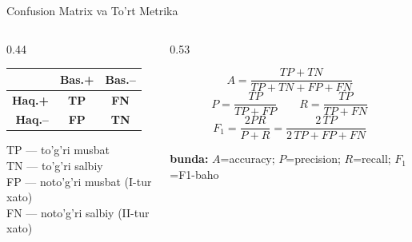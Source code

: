 \documentclass[aspectratio=169,11pt]{beamer}
\newcommand{\bunda}[1]{{\small\textbf{bunda:}\; #1}}
\begin{document}
\begin{frame}{Confusion Matrix va To'rt Metrika}
  \begin{columns}[T]
    \begin{column}{0.44\textwidth}
      \small
      \begin{center}
        {\renewcommand{\arraystretch}{1.4}%
        \begin{tabular}{r|cc}
          & \textbf{Bas.+} & \textbf{Bas.--} \\
          \hline
          \textbf{Haq.+} &
            \textcolor{deepgreen}{\textbf{TP}} &
            \textcolor{deepred}{\textbf{FN}} \\
          \textbf{Haq.--} &
            \textcolor{deepred}{\textbf{FP}} &
            \textcolor{deepgreen}{\textbf{TN}} \\
        \end{tabular}}
      \end{center}
      \vspace{4pt}
      \footnotesize
      TP --- to'g'ri musbat\\
      TN --- to'g'ri salbiy\\
      FP --- noto'g'ri musbat (I-tur xato)\\
      FN --- noto'g'ri salbiy (II-tur xato)
    \end{column}
    \begin{column}{0.53\textwidth}
      \begin{tcolorbox}[defbox,title=To'rt metrika]
        \small
        \[
          A = \frac{TP+TN}{TP+TN+FP+FN}
        \]
        \[
          P = \frac{TP}{TP+FP}
          \qquad
          R = \frac{TP}{TP+FN}
        \]
        \[
          F_1 = \frac{2PR}{P+R}
              = \frac{2\,TP}{2\,TP+FP+FN}
        \]
      \end{tcolorbox}
      \bunda{%
        $A$=accuracy;\;
        $P$=precision;\;
        $R$=recall;\;
        $F_1$=F1-baho%
      }
    \end{column}
  \end{columns}
\end{frame}
\end{document}
